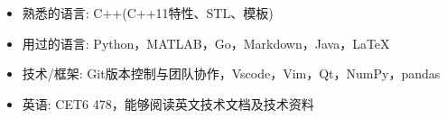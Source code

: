 \begin{itemize}[leftmargin=*]
  \item 熟悉的语言: C++(C++11特性、STL、模板)
  \item 用过的语言: Python，MATLAB，Go，Markdown，Java，LaTeX
  \item {技术/框架}: Git版本控制与团队协作，Vscode，Vim，Qt，NumPy，pandas
  \item 英语: CET6 478，能够阅读英文技术文档及技术资料
\end{itemize}
